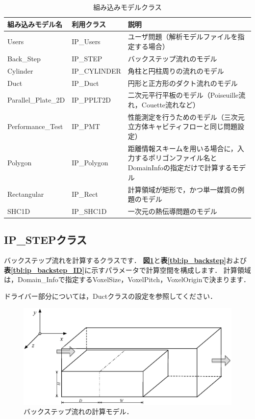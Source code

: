 \begin{table}[htdp]
\caption{組み込みモデルクラス}
\begin{center}
\small
\begin{tabular}{lll}\toprule
組み込みモデル名 & 利用クラス & 説明\\ \midrule
Users & IP\_Users & ユーザ問題（解析モデルファイルを指定する場合）\\ \hline
Back\_Step & IP\_STEP & バックステップ流れのモデル\\
Cylinder & IP\_CYLINDER & 角柱と円柱周りの流れのモデル\\
Duct & IP\_Duct & 円形と正方形のダクト流れのモデル\\
Parallel\_Plate\_2D & IP\_PPLT2D & 二次元平行平板のモデル（Poiseuille流れ，Couette流れなど）\\
Performance\_Test & IP\_PMT & 性能測定を行うためのモデル（三次元立方体キャビティフローと同じ問題設定）\\
Polygon & IP\_Polygon & 距離情報スキームを用いる場合に，入力するポリゴンファイル名とDomainInfoの指定だけで計算するモデル\\
Rectangular & IP\_Rect & 計算領域が矩形で，かつ単一媒質の例題のモデル\\
SHC1D & IP\_SHC1D & 一次元の熱伝導問題のモデル\\ 
\bottomrule
\end{tabular}
\end{center}
\label{tbl:intrinsic problems}
\end{table}

%
\subsection{IP\_STEPクラス}
バックステップ流れを計算するクラスです．
\textbf{図\ref{fig:ip_backstep}}と\textbf{表\ref{tbl:ip_backstep}}および\textbf{表\ref{tbl:ip_backstep_ID}}に示すパラメータで計算空間を構成します．
計算領域は，Domain\_Infoで指定するVoxelSize，VoxelPitch，VoxelOriginで決まります．

ドライバー部分については，Ductクラスの設定を参照してください．

\begin{figure}[htdp]
\begin{center}
\includegraphics[width=14cm,clip]{Backstep.eps}
\end{center}
\caption{バックステップ流れの計算モデル．}
\label{fig:ip_backstep}
\end{figure}

